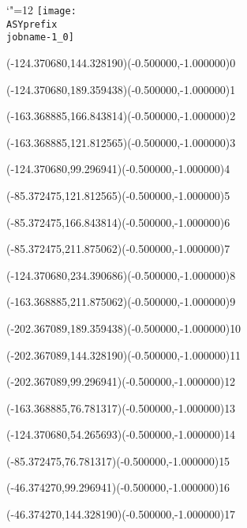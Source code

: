 \setlength{\unitlength}{1pt}%
\makeatletter%
\let\ASYencoding\f@encoding%
\let\ASYfamily\f@family%
\let\ASYseries\f@series%
\let\ASYshape\f@shape%
\makeatother%
{\catcode`"=12%
\texttt{[image: \\ASYprefix\\jobname-1\_0]}%
}%
%
\fontsize{12.000000}{14.400000}\selectfont%
\usefont{\ASYencoding}{\ASYfamily}{\ASYseries}{\ASYshape}%
\ASYalign(-124.370680,144.328190)(-0.500000,-1.000000){0}%
%
\fontsize{12.000000}{14.400000}\selectfont%
\ASYalign(-124.370680,189.359438)(-0.500000,-1.000000){1}%
%
\fontsize{12.000000}{14.400000}\selectfont%
\ASYalign(-163.368885,166.843814)(-0.500000,-1.000000){2}%
%
\fontsize{12.000000}{14.400000}\selectfont%
\ASYalign(-163.368885,121.812565)(-0.500000,-1.000000){3}%
%
\fontsize{12.000000}{14.400000}\selectfont%
\ASYalign(-124.370680,99.296941)(-0.500000,-1.000000){4}%
%
\fontsize{12.000000}{14.400000}\selectfont%
\ASYalign(-85.372475,121.812565)(-0.500000,-1.000000){5}%
%
\fontsize{12.000000}{14.400000}\selectfont%
\ASYalign(-85.372475,166.843814)(-0.500000,-1.000000){6}%
%
\fontsize{12.000000}{14.400000}\selectfont%
\ASYalign(-85.372475,211.875062)(-0.500000,-1.000000){7}%
%
\fontsize{12.000000}{14.400000}\selectfont%
\ASYalign(-124.370680,234.390686)(-0.500000,-1.000000){8}%
%
\fontsize{12.000000}{14.400000}\selectfont%
\ASYalign(-163.368885,211.875062)(-0.500000,-1.000000){9}%
%
\fontsize{12.000000}{14.400000}\selectfont%
\ASYalign(-202.367089,189.359438)(-0.500000,-1.000000){10}%
%
\fontsize{12.000000}{14.400000}\selectfont%
\ASYalign(-202.367089,144.328190)(-0.500000,-1.000000){11}%
%
\fontsize{12.000000}{14.400000}\selectfont%
\ASYalign(-202.367089,99.296941)(-0.500000,-1.000000){12}%
%
\fontsize{12.000000}{14.400000}\selectfont%
\ASYalign(-163.368885,76.781317)(-0.500000,-1.000000){13}%
%
\fontsize{12.000000}{14.400000}\selectfont%
\ASYalign(-124.370680,54.265693)(-0.500000,-1.000000){14}%
%
\fontsize{12.000000}{14.400000}\selectfont%
\ASYalign(-85.372475,76.781317)(-0.500000,-1.000000){15}%
%
\fontsize{12.000000}{14.400000}\selectfont%
\ASYalign(-46.374270,99.296941)(-0.500000,-1.000000){16}%
%
\fontsize{12.000000}{14.400000}\selectfont%
\ASYalign(-46.374270,144.328190)(-0.500000,-1.000000){17}%
%
